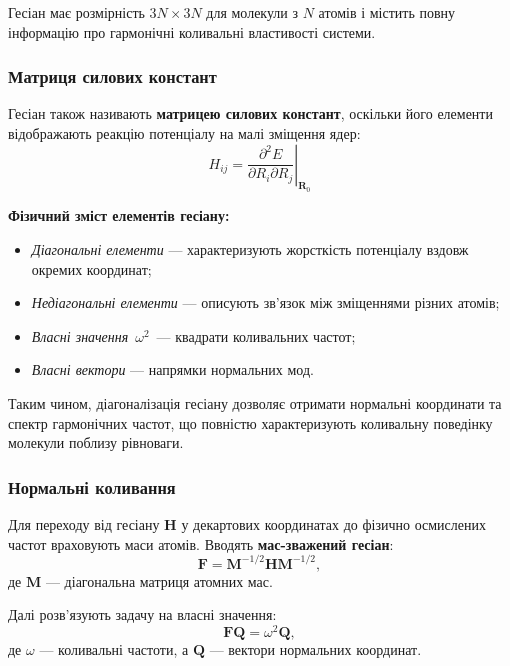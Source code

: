 Гесіан має розмірність $3N \times 3N$ для молекули з $N$ атомів
і містить повну інформацію про гармонічні коливальні властивості системи.

\subsubsection{Матриця силових констант}

Гесіан також називають \textbf{матрицею силових констант}, оскільки його елементи відображають реакцію потенціалу на малі зміщення ядер:
\[
    H_{ij} = \left.\frac{\partial^2 E}{\partial R_i \partial R_j}\right|_{\mathbf{R}_0}
\]

\textbf{Фізичний зміст елементів гесіану:}
\begin{itemize}
    \item \textit{Діагональні елементи} --- характеризують жорсткість потенціалу вздовж окремих координат;
    \item \textit{Недіагональні елементи} --- описують зв’язок між зміщеннями різних атомів;
    \item \textit{Власні значення} $\,\omega^2\,$ --- квадрати коливальних частот;
    \item \textit{Власні вектори} --- напрямки нормальних мод.
\end{itemize}

Таким чином, діагоналізація гесіану дозволяє отримати нормальні координати та спектр гармонічних частот, що повністю характеризують коливальну поведінку молекули поблизу рівноваги.

\subsubsection{Нормальні коливання}

Для переходу від гесіану $\mathbf{H}$ у декартових координатах до фізично осмислених частот враховують маси атомів.
Вводять \textbf{мас-зважений гесіан}:
\[
    \mathbf{F} = \mathbf{M}^{-1/2} \mathbf{H} \mathbf{M}^{-1/2},
\]
де $\mathbf{M}$ --- діагональна матриця атомних мас.

Далі розв'язують задачу на власні значення:
\[
    \mathbf{F} \mathbf{Q} = \omega^2 \mathbf{Q},
\]
де $\omega$ --- коливальні частоти, а $\mathbf{Q}$ --- вектори нормальних координат.

